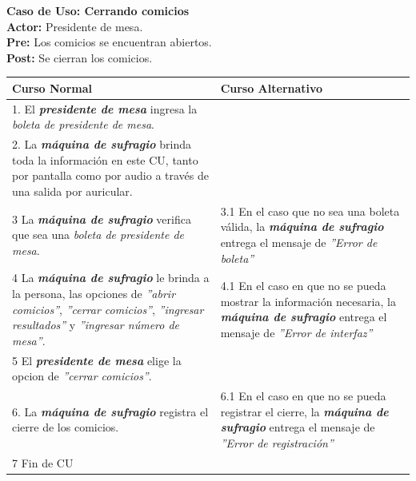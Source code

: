 \documentclass[spanish, 10pt,a4paper]{article}
\numberwithin{equation}{section} %
\begin{document}
\noindent\textbf{Caso de Uso: Cerrando comicios}\\
\textbf{Actor: } Presidente de mesa.\\
\textbf{Pre: } Los comicios se encuentran abiertos.\\
\textbf{Post: } Se cierran los comicios.\\
\begin{table}[H]
  \centering
\bgroup
\def\arraystretch{1.3}
  \begin{tabular}{p{9cm} | p{7cm}}
    \hline
    Curso Normal & Curso Alternativo \\
    \hline
    \hline    
    1. El \textbf{\textit{presidente de mesa}} ingresa la \textit{boleta de presidente de mesa}. 
    & \\
    
    \hline
    2. La \textbf{\textit{máquina de sufragio}} brinda toda la información en este CU, tanto por pantalla como por audio a través de una salida por auricular.
    &
    \\
    
    \hline
    3 La \textbf{\textit{máquina de sufragio}} verifica que sea una \textit{boleta de presidente de mesa}.
    & 
    3.1 En el caso que no sea una boleta válida, la \textbf{\textit{máquina de sufragio}} entrega el mensaje de \textit{''Error de boleta''}
    \\
    
    \hline
    4 La \textbf{\textit{máquina de sufragio}} le brinda a la persona, las opciones de \textit{''abrir comicios''}, \textit{''cerrar comicios''}, \textit{''ingresar resultados''} y \textit{''ingresar número de mesa''}.
    & 
    4.1 En el caso en que no se pueda mostrar la información necesaria, la \textbf{\textit{máquina de sufragio}} entrega el mensaje de \textit{''Error de interfaz''}
    \\
    
    \hline
    5 El \textbf{\textit{presidente de mesa}} elige la opcion de \textit{''cerrar comicios''}.
    & \\
    
    \hline
    6. La \textbf{\textit{máquina de sufragio}} registra el cierre de los comicios.
    &
    6.1 En el caso en que no se pueda registrar el cierre, la \textbf{\textit{máquina de sufragio}} entrega el mensaje de \textit{''Error de registración''}
    \\
    
    \hline
    7 Fin de CU
    & \\
    \hline
  \end{tabular}
\egroup
\end{table}
\end{document}
